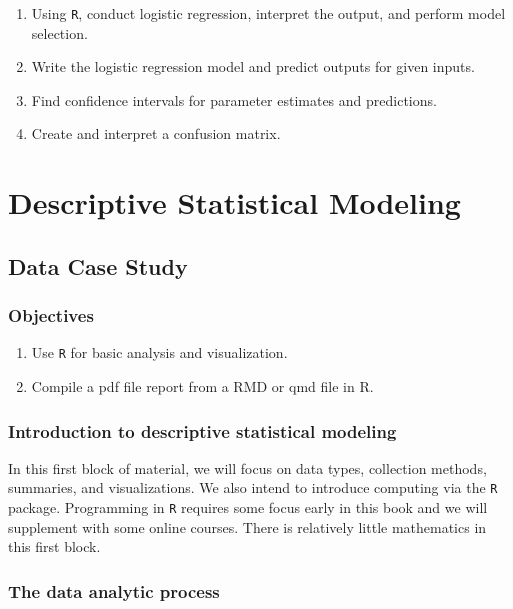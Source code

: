 \documentclass[
  letterpaper,
  DIV=11,
  numbers=noendperiod]{scrreprt}
\begin{document}
\begin{enumerate}
\def\labelenumi{\arabic{enumi})}
\item
  Using \texttt{R}, conduct logistic regression, interpret the output,
  and perform model selection.
\item
  Write the logistic regression model and predict outputs for given
  inputs.
\item
  Find confidence intervals for parameter estimates and predictions.
\item
  Create and interpret a confusion matrix.
\end{enumerate}

\part{Descriptive Statistical Modeling}

\chapter{Data Case Study}\label{CS1}

\section{Objectives}\label{objectives-1}

\begin{enumerate}
\def\labelenumi{\arabic{enumi})}
\item
  Use \texttt{R} for basic analysis and visualization.
\item
  Compile a pdf file report from a RMD or qmd file in R.
\end{enumerate}

\section{Introduction to descriptive statistical
modeling}\label{introduction-to-descriptive-statistical-modeling}

In this first block of material, we will focus on data types, collection
methods, summaries, and visualizations. We also intend to introduce
computing via the \texttt{R} package. Programming in \texttt{R} requires
some focus early in this book and we will supplement with some online
courses. There is relatively little mathematics in this first block.

\section{The data analytic process}\label{the-data-analytic-process}
\end{document}
